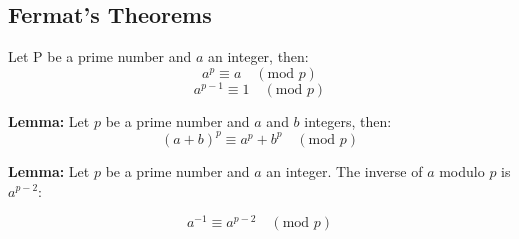 \subsection{Fermat's Theorems}
Let P be a prime number and $a$ an integer, then:
$$a^p \equiv a \quad (\text{mod } p)$$
$$a^{p-1} \equiv 1 \quad (\text{mod } p)$$

\textbf{Lemma:} Let $p$ be a prime number and $a$ and $b$ integers, then:
$$(a+b)^{p} \equiv a^{p} + b^{p} \quad (\text{mod } p)$$

\textbf{Lemma:} Let $p$ be a prime number and $a$ an integer. The inverse of $a$ modulo $p$ is $a^{p-2}$:

$$a^{-1} \equiv a^{p-2} \quad (\text{mod } p)$$
